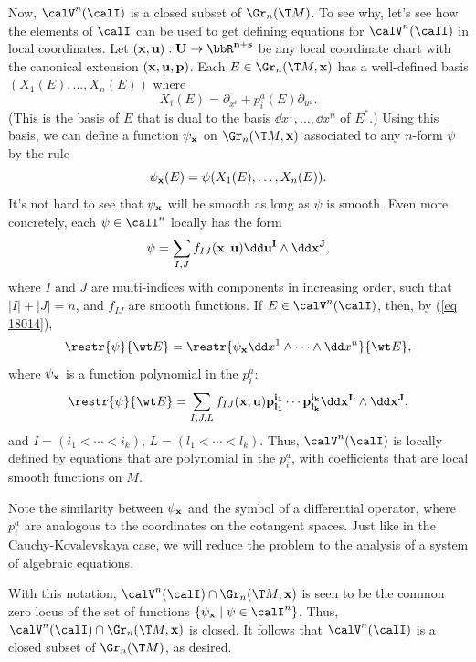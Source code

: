 

Now, $\calV^n(\calI)$ is a closed subset of $\Gr_n(\T M)$. To see why, let's see how the elements of $\calI$ can be used to get defining equations for $\calV^n(\calI)$ in local coordinates. Let $(\bf{x},\bf{u}):U\to\bbR^{n+s}$ be any local coordinate chart with the canonical extension $(\bf{x},\bf{u},\bf{p})$. Each $E\in\Gr_n(\T M,\bf{x})$ has a well-defined basis $(X_1(E),\ldots,X_n(E))$ where 
\[X_i(E)=\partial_{x^i}+p^a_i(E)\partial_{u^a}.\]
(This is the basis of $E$ that is dual to the basis $\dd x^1,\ldots,\dd x^n$ of $E^\ast$.) Using this basis, we can define a function $\psi_{\bf{x}}$ on $\Gr_n(\T M,\bf{x})$ associated to any $n$-form $\psi$ by the rule 
\[\psi_{\bf{x}}(E)=\psi(X_1(E),\ldots,X_n(E)).\]
It's not hard to see that $\psi_{\bf{x}}$ will be smooth as long as $\psi$ is smooth. Even more concretely, each $\psi\in\calI^n$ locally has the form 
\[\psi=\sum_{I,J}f_{IJ}(\bf{x},\bf{u})\dd \bf{u}^I\wedge \dd \bf{x}^J,\]
where $I$ and $J$ are multi-indices with components in increasing order, such that $|I|+|J|=n$, and $f_{IJ}$ are smooth functions. If $E\in\calV^n(\calI)$, then, by (\ref{eq 18014}), 
\[\restr{\psi}{\wt E}=\restr{\psi_{\bf x} \dd x^1\wedge\cdots \wedge\dd x^n}{\wt E},\] 
where $\psi_{\bf x}$ is a function polynomial in the $p^a_i$:
\[\restr{\psi}{\wt E}=\sum_{I,J,L}f_{IJ}(\bf{x},\bf{u})p^{i_1}_{l_1}\cdots p^{i_k}_{l_k}\dd \bf{x}^L\wedge \dd \bf{x}^J,\]
and $I=(i_1<\cdots<i_k)$, $L=(l_1<\cdots<l_k)$. Thus, $\calV^n(\calI)$ is locally defined by equations that are polynomial in the $p^a_i$, with coefficients that are local smooth functions on $M$. 

Note the similarity between $\psi_{\bf{x}}$ and the symbol of a differential operator, where $p^a_i$ are analogous to the coordinates on the cotangent spaces. Just like in the Cauchy-Kovalevskaya case, we will reduce the problem to the analysis of a system of algebraic equations.

With this notation, $\calV^n(\calI)\cap \Gr_n(\T M,\bf{x})$ is seen to be the common zero locus of the set of functions $\{\psi_{\bf{x}}\mid \psi\in \calI^n\}$. Thus, $\calV^n(\calI)\cap \Gr_n(\T M,\bf{x})$ is closed. It follows that $\calV^n(\calI)$ is a closed subset of $\Gr_n(\T M)$, as desired.






